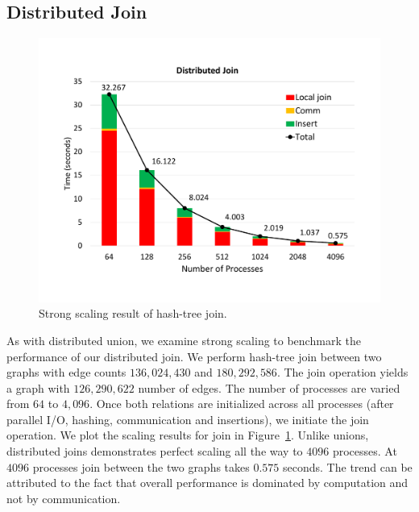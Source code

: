 

\subsection{Distributed Join}
\label{sec:join}

\begin{figure}[h]
	\includegraphics[width=\columnwidth]{results/join.pdf}
	\caption{Strong scaling result of hash-tree join.}
	\label{fig:dist_join}
\end{figure}

As with distributed union, we examine strong scaling to benchmark the performance of our distributed join.
We perform hash-tree join between two graphs with edge counts $136,\!024,\!430$ and $180,\!292,\!586$. The join operation yields a graph with $126,\!290,\!622$ number of edges.
The number of processes are varied from $64$ to $4,096$. 
Once both relations are initialized across all processes (after parallel I/O, hashing, communication and insertions), we initiate the join operation. 
We plot the scaling results for join in Figure~\ref{fig:dist_join}.
Unlike unions, distributed joins demonstrates perfect scaling all the way to $4096$ processes. At $4096$ processes join between the two graphs takes $0.575$ seconds. The trend can be attributed to the fact that overall performance is dominated by computation and not by communication.


